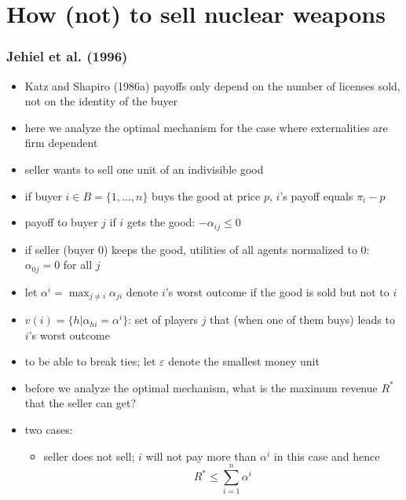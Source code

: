 \documentclass[11pt,english]{beamer}
\newcommand{\ve}{\varepsilon}
\begin{document}
\section{How (not) to sell nuclear weapons}
\label{sec-3}
\begin{frame}[allowframebreaks]\frametitle{Jehiel et al. (1996)}
\label{sec-3-1}
\begin{itemize}

\item Katz and Shapiro (1986a) payoffs only depend on the number of licenses sold, not on the identity of the buyer\\
\label{sec-3-1-1}%
\item here we analyze the optimal mechanism for the case where
  externalities are firm dependent \\
\label{sec-3-1-2}%
\item seller wants to sell one unit of an indivisible good\\
\label{sec-3-1-3}%
\item if buyer $i \in B = \{1,...,n\}$ buys the good at price $p$, $i$'s payoff equals $\pi_{i}-p$\\
\label{sec-3-1-4}%
\item payoff to buyer $j$ if $i$ gets the good: $-\alpha_{ij} \leq 0$\\
\label{sec-3-1-5}%
\item if seller (buyer 0) keeps the good, utilities of all agents normalized to 0: $\alpha_{0j}=0$ for all $j$\\
\label{sec-3-1-6}%
\item let $\alpha^{i}=\max_{j \neq i} \alpha_{ji}$ denote $i$'s worst outcome if the good is sold but not to $i$\\
\label{sec-3-1-7}%
\item $v(i) = \{h |\alpha_{hi} =\alpha^{i} \}$: set of players $j$ that (when one of them buys) leads to $i$'s worst outcome\\
\label{sec-3-1-8}%
\item to be able to break ties; let $\ve$ denote the smallest money unit\\
\label{sec-3-1-9}%
\item before we analyze the optimal mechanism, what is the maximum revenue $R^{*}$ that the seller can get?\\
\label{sec-3-1-10}%
\item two cases:
\label{sec-3-1-11}%
\begin{itemize}

\item seller does not sell; $i$ will not pay more than $\alpha^{i}$ in this case and hence
\label{sec-3-1-11-1}%
\begin{equation*}
R^*\leq \sum_{i=1}^{n} \alpha^{i}
\end{equation*}


\end{itemize}
\end{itemize}
\end{frame}
\end{document}
